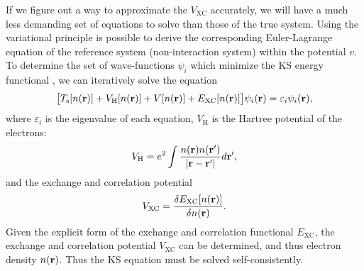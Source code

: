 If we figure out a way to approximate the $V_{\text{XC}}$ accurately, we will have a much less demanding set of equations 
to solve than those of the true system\cite{Burke07}.
Using the variational principle is possible to derive the corresponding Euler-Lagrange equation of the reference 
system (non-interaction system) within the potential $v$.
To determine the set of wave-functions $\psi_i$ which minimize the KS energy functional , we can iteratively solve the equation
\begin{align}
  \bigl[T_\text{s}[n({\bf {r}})] +V_\text{H}[n({\bf{r}})] +V[n({\bf{r}})]+E_{\text{XC}}[n({\bf{r}})] \bigr]\psi_i({\bf{r}})=\varepsilon_i\psi_i({\bf{r}}), \label{eq:KSE}
\end{align}
where $\varepsilon_i$ is the eigenvalue of each equation, $V_\text{H}$ is the Hartree potential of the electrons:
\begin{align}
 V_{\text H} = e^2 \int\frac{n({\bf r})n({\bf r}') }{|{\bf r}- {\bf r}'|}d{\bf r} ',
 \end{align}
and the exchange and correlation potential
 \begin{align}
 V_{\text {XC}} = \frac{\delta E_{\text{XC}}[n({\bf r})]} {\delta n({\bf r}) }.
 \end{align}
Given the explicit form of the exchange and correlation functional $E_{\text{XC}}$, the exchange and correlation potential $V_{\text {XC}}$ can be determined, and thus electron density $n({\bf r})$. Thus the KS equation must be solved self-consistently.

